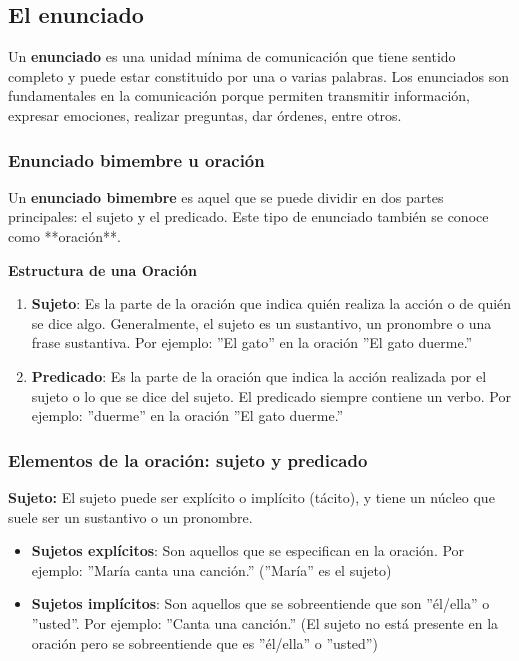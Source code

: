 \subsection{El enunciado}

Un \textbf{enunciado} es una unidad mínima de comunicación que tiene sentido completo y puede estar constituido por una o varias palabras. Los enunciados son fundamentales en la comunicación porque permiten transmitir información, expresar emociones, realizar preguntas, dar órdenes, entre otros.

\subsubsection{Enunciado bimembre u oración}

Un \textbf{enunciado bimembre} es aquel que se puede dividir en dos partes principales: el sujeto y el predicado. Este tipo de enunciado también se conoce como **oración**.

\textbf{Estructura de una Oración}

\begin{enumerate}
      \item \textbf{Sujeto}: Es la parte de la oración que indica quién realiza la acción o de quién se dice algo. Generalmente, el sujeto es un sustantivo, un pronombre o una frase sustantiva. Por ejemplo: ''El gato'' en la oración ''El gato duerme.''
      \item \textbf{Predicado}: Es la parte de la oración que indica la acción realizada por el sujeto o lo que se dice del sujeto. El predicado siempre contiene un verbo. Por ejemplo: ''duerme'' en la oración ''El gato duerme.''
\end{enumerate}

\subsubsection{Elementos de la oración: sujeto y predicado}

\textbf{Sujeto:} El sujeto puede ser explícito o implícito (tácito), y tiene un núcleo que suele ser un sustantivo o un pronombre.

\begin{itemize}
      \item \textbf{Sujetos explícitos}: Son aquellos que se especifican en la oración. Por ejemplo: ''María canta una canción.'' (''María'' es el sujeto)
      \item \textbf{Sujetos implícitos}: Son aquellos que se sobreentiende que son ''él/ella'' o ''usted''. Por ejemplo: ''Canta una canción.'' (El sujeto no está presente en la oración pero se sobreentiende que es ''él/ella'' o ''usted'')
\end{itemize}

